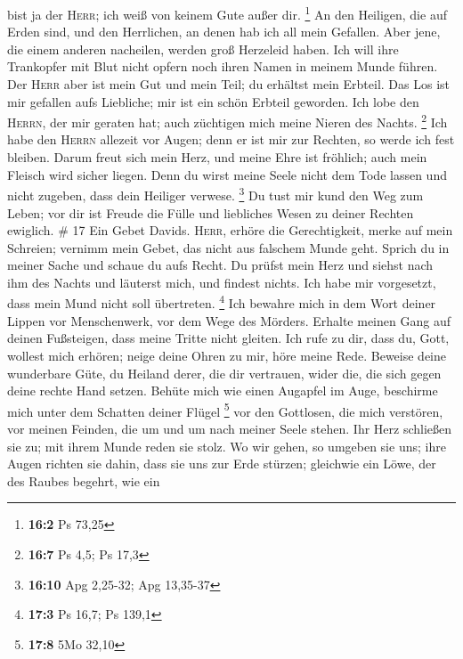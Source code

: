 bist ja der \textsc{Herr}; ich weiß von keinem Gute außer dir.
\footnote{\textbf{16:2} Ps 73,25}  An den Heiligen, die
auf Erden sind, und den Herrlichen, an denen hab ich all mein Gefallen.
 Aber jene, die einem anderen nacheilen, werden groß
Herzeleid haben. Ich will ihre Trankopfer mit Blut nicht opfern noch
ihren Namen in meinem Munde führen.  Der \textsc{Herr}
aber ist mein Gut und mein Teil; du erhältst mein Erbteil.
 Das Los ist mir gefallen aufs Liebliche; mir ist ein
schön Erbteil geworden.  Ich lobe den \textsc{Herrn}, der
mir geraten hat; auch züchtigen mich meine Nieren des Nachts.
\footnote{\textbf{16:7} Ps 4,5; Ps 17,3}  Ich habe den
\textsc{Herrn} allezeit vor Augen; denn er ist mir zur Rechten, so werde
ich fest bleiben.  Darum freut sich mein Herz, und meine
Ehre ist fröhlich; auch mein Fleisch wird sicher liegen. 
Denn du wirst meine Seele nicht dem Tode lassen und nicht zugeben, dass
dein Heiliger verwese. \footnote{\textbf{16:10} Apg 2,25-32; Apg
  13,35-37}  Du tust mir kund den Weg zum Leben; vor dir
ist Freude die Fülle und liebliches Wesen zu deiner Rechten ewiglich. \#
17  Ein Gebet Davids. \textsc{Herr}, erhöre die
Gerechtigkeit, merke auf mein Schreien; vernimm mein Gebet, das nicht
aus falschem Munde geht.  Sprich du in meiner Sache und
schaue du aufs Recht.  Du prüfst mein Herz und siehst nach
ihm des Nachts und läuterst mich, und findest nichts. Ich habe mir
vorgesetzt, dass mein Mund nicht soll übertreten. \footnote{\textbf{17:3}
  Ps 16,7; Ps 139,1}  Ich bewahre mich in dem Wort deiner
Lippen vor Menschenwerk, vor dem Wege des Mörders. 
Erhalte meinen Gang auf deinen Fußsteigen, dass meine Tritte nicht
gleiten.  Ich rufe zu dir, dass du, Gott, wollest mich
erhören; neige deine Ohren zu mir, höre meine Rede. 
Beweise deine wunderbare Güte, du Heiland derer, die dir vertrauen,
wider die, die sich gegen deine rechte Hand setzen. 
Behüte mich wie einen Augapfel im Auge, beschirme mich unter dem
Schatten deiner Flügel \footnote{\textbf{17:8} 5Mo 32,10} 
vor den Gottlosen, die mich verstören, vor meinen Feinden, die um und um
nach meiner Seele stehen.  Ihr Herz schließen sie zu; mit
ihrem Munde reden sie stolz.  Wo wir gehen, so umgeben
sie uns; ihre Augen richten sie dahin, dass sie uns zur Erde stürzen;
 gleichwie ein Löwe, der des Raubes begehrt, wie ein
